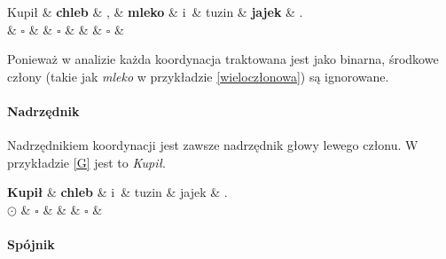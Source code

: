 \begin{exe}
\ex \label{wieloczłonowa}
\begin{dependency}[baseline=0.9ex]
\begin{deptext}[column sep=1em,  row sep=.1ex]
Kupił \& \textbf{chleb} \& , \& \textbf{mleko} \& i~\& tuzin \& \textbf{jajek} \& .  \\ 
 \& \textbf{$\square$} \& \& \textbf{$\square$} \& \& \& \textbf{$\square$} \& \\ 
\end{deptext}
\end{dependency}
\end{exe}

Ponieważ w analizie każda koordynacja traktowana jest jako binarna, środkowe człony (takie jak \textit{mleko} w przykładzie \eqref{wieloczłonowa}) są ignorowane.

\paragraph{Nadrzędnik}

Nadrzędnikiem koordynacji jest zawsze nadrzędnik głowy lewego członu. W przykładzie \eqref{G} jest to \textit{Kupił}.

\begin{exe}
\ex \label{G}
\begin{dependency}[baseline=0.9ex]
\begin{deptext}[column sep=1em, row sep=.1ex]
\textbf{Kupił} \& \textbf{chleb} \& i~\& tuzin \& jajek \& .  \\ 
\textbf{$\odot$} \& $\square$ \& \& \& $\square$ \& \\ 
\end{deptext}
\end{dependency}
\end{exe}

\paragraph{Spójnik}

